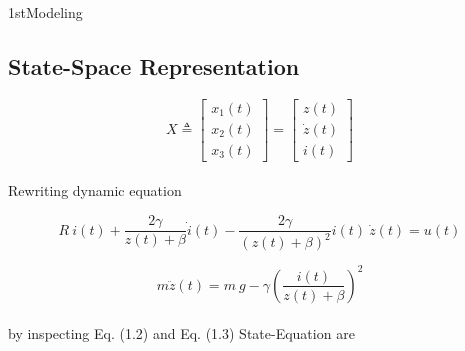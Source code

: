 \documentclass{article}
\begin{document}
\pagecolor{white}
\maketitle
\thispagestyle{empty}
\setcounter{page}{0}
\newpage




\begin{homeworkProblem}{1st}{Modeling}
\vspace{-1.5em}

\subsection{State-Space Representation}

\begin{equation}
X \triangleq \begin{bmatrix}
x_1(t)\\
x_2(t)\\
x_3(t)
\end{bmatrix} = \begin{bmatrix}
z(t)\\
\dot{z}(t)\\
i(t)
\end{bmatrix}
\end{equation}
\\Rewriting dynamic equation

\begin{equation}
R~i(t) + \frac{2 \gamma}{z(t)+\beta} \dot{i}(t) - \frac{2 \gamma}{(z(t) + \beta)^2} i(t) ~\dot{z}(t) = u(t) 
\end{equation}

\begin{equation}
m \ddot{z}(t) = m~g - \gamma (\frac{i(t)}{z(t)+\beta})^2
\end{equation}
\\by inspecting Eq. (1.2) and Eq. (1.3) State-Equation are


\end{homeworkProblem}
\end{document}
